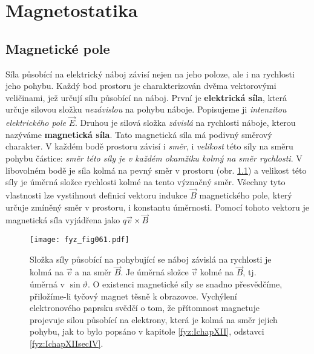 \chapter{Magnetostatika}\label{fyz:IIchapXIII}
\minitoc

  \section{Magnetické pole}\label{fyz:IIchapXIIIsecI}
    \cite[s.~224]{Feynman02} Síla působící na elektrický náboj závisí nejen na jeho poloze, ale i 
    na rychlosti jeho pohybu. Každý bod prostoru je charakterizován dvěma vektorovými veličinami, 
    jež určují sílu působící na náboj. První je \textbf{elektrická síla}, která určuje silovou 
    složku \emph{nezávislou} na pohybu náboje. Popisujeme ji \emph{intenzitou elektrického pole} 
    \(\vec{E}\). Druhou je silová složka \emph{závislá} na rychlosti náboje, kterou nazýváme 
    \textbf{magnetická síla}. Tato magnetická síla má podivný směrový charakter. V každém bodě 
    prostoru závisí i \emph{směr}, i \emph{velikost} této síly na směru pohybu částice: \emph{směr 
    této síly je v každém okamžiku kolmý na směr rychlosti}. V libovolném bodě je síla kolmá na 
    pevný směr v prostoru (obr. \ref{fyz:fig061}) a velikost této síly je úměrná složce 
    rychlosti kolmé na tento význačný směr. Všechny tyto vlastnosti lze vystihnout definicí vektoru 
    indukce \(\vec{B}\) magnetického pole, který určuje zmíněný směr v prostoru, i konstantu 
    úměrnosti. Pomocí tohoto vektoru je magnetická síla vyjádřena jako \(q\vec{v}\times\vec{B}\)    

    \begin{figure}[ht!]  %
      \centering
      \texttt{[image: fyz\_fig061.pdf]}
      \caption{Složka síly působící na pohybující se náboj závislá na rychlosti je kolmá na 
               \(\vec{v}\) a na směr \(\vec{B}\). Je úměrná složce \(\vec{v}\) kolmé na 
               \(\vec{B}\), tj. úměrná v \(\sin\vartheta\). O existenci magnetické síly se snadno 
                přesvědčíme, přiložíme-li tyčový magnet těsně k obrazovce. Vychýlení elektronového 
                paprsku svědčí o tom, že přítomnost magnetuje projevuje silou působící na 
                elektrony, která je kolmá na směr jejich pohybu, jak to bylo popsáno v kapitole 
                \ref{fyz:IchapXII}, odstavci \ref{fyz:IchapXIIsecIV}.
                \cite[s.~225]{Feynman02}}
      \label{fyz:fig061}
    \end{figure}
    
